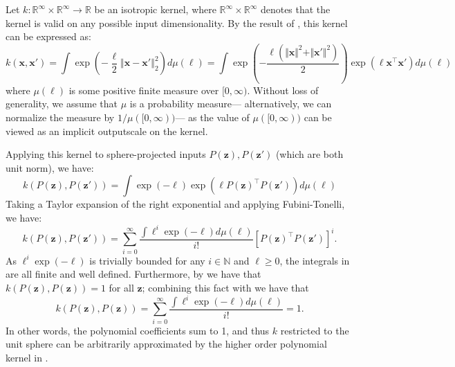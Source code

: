 \documentclass[twoside]{article}
\theoremstyle{plain}
\theoremstyle{definition}
\begin{document}
Let $k: \mathbb R^\infty \times \mathbb R^\infty \to \mathbb R$ be an isotropic kernel, where $\mathbb R^\infty \times \mathbb R^\infty$ denotes that the kernel is valid on any possible input dimensionality.
By the result of \citet[][Theorem~2]{schoenberg1938metric}, this kernel can be expressed as:
\begin{equation}
    k(\mathbf x, \mathbf x') = \int \exp\left(- \frac{\ell}{2} \left\Vert \mathbf x - \mathbf x' \right\Vert_2^2\right) d \mu(\ell)
    = \int \exp\left(- \frac{\ell \left( \Vert \mathbf x \Vert^2 + \Vert \mathbf x' \Vert^2 \right)}{2} \right) \exp\left( \ell \mathbf x^\top \mathbf x' \right) d \mu(\ell)
    \label{eqn:shoenberg_isometric}
\end{equation}
where $\mu(\ell)$ is some positive finite measure over $[0, \infty)$.
Without loss of generality, we assume that $\mu$ is a probability measure---%
alternatively, we can normalize the measure
by $1/\mu([0, \infty))$---%
as the value of $\mu([0, \infty))$ can be viewed as an implicit outputscale on the kernel.

Applying this kernel to sphere-projected inputs $P(\mathbf z), P(\mathbf z')$
(which are both unit norm), we have:
\begin{equation}
    k(P(\mathbf z), P(\mathbf z')) = \int \exp\left(- \ell \right) \exp\left( \ell P(\mathbf z)^\top P(\mathbf z') \right) d \mu(\ell)
    \nonumber
\end{equation}
Taking a Taylor expansion of the right exponential and applying Fubini-Tonelli,
we have:
\begin{equation}
    k(P(\mathbf z), P(\mathbf z')) = \sum_{i=0}^\infty \frac{\int \ell^i \exp\left(- \ell \right) d \mu(\ell)}{i!} \left[ P(\mathbf z)^\top P(\mathbf z') \right]^i.
    \label{eqn:shoenberg_taylor}
\end{equation}
As $\ell^i \exp\left(- \ell \right)$ is trivially bounded for any $i \in \mathbb N$ and $\ell \geq 0$, the integrals in  are all finite and well defined.
Furthermore, by  we have that $k(P(\mathbf z), P(\mathbf z)) = 1$ for all $\mathbf z$; combining this fact with  we have that
\begin{equation}
k(P(\mathbf z), P(\mathbf z)) = \sum_{i=0}^\infty \frac{\int \ell^i \exp\left(- \ell \right) d \mu(\ell)}{i!} = 1.
\end{equation}
In other words, the polynomial coefficients sum to 1, and thus $k$ restricted to the unit sphere can be arbitrarily approximated by the higher order polynomial kernel in .
\end{document}
